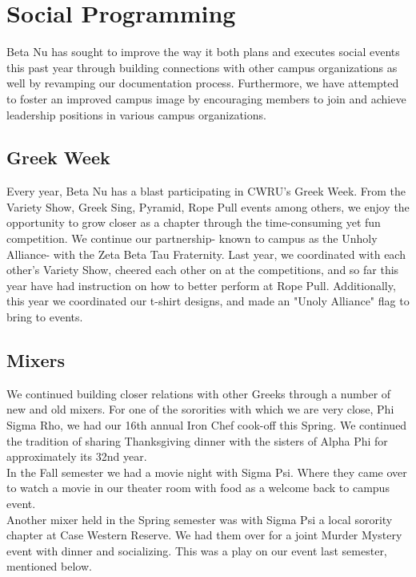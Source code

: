 \chapter{Social Programming}

  Beta Nu has sought to improve the way it both plans and executes social events
  this past year through building connections with other campus organizations as
  well by revamping our documentation process.  Furthermore, we have attempted
  to foster an improved campus image by encouraging members to join and achieve
  leadership positions in various campus organizations.
    
  \section*{Greek Week}
    Every year, Beta Nu has a blast participating in CWRU's Greek Week. From the
    Variety Show, Greek Sing, Pyramid, Rope Pull events among others, we enjoy
    the opportunity to grow closer as a chapter through the time-consuming yet
    fun competition. We continue our partnership- known to campus as the Unholy
    Alliance- with the Zeta Beta Tau Fraternity. Last year, we coordinated with
    each other's Variety Show, cheered each other on at the competitions, and so
    far this year have had instruction on how to better perform at Rope Pull.
    Additionally, this year we coordinated our t-shirt designs, and made an 
    "Unoly Alliance" flag to bring to events. \\
    
  \section*{Mixers}
    
    We continued building closer relations with other Greeks through a number of
    new and old mixers. For one of the sororities with which we are very close,
    Phi Sigma Rho, we had our 16th annual Iron Chef cook-off this Spring. We
    continued the tradition of sharing Thanksgiving dinner with the sisters of
    Alpha Phi for approximately its 32nd year. \\

	In the Fall semester we had a movie night with Sigma Psi. Where they came over 
	to watch a movie in our theater room with food as a welcome back to campus event. \\

    Another mixer held in the Spring semester was with Sigma Psi a local sorority 
    chapter at Case Western Reserve. We had them over for a joint Murder Mystery 
    event with dinner and socializing. This was a play on our event last semester, 
    mentioned below. \\
    

